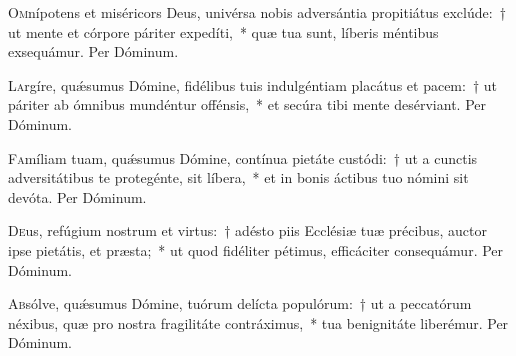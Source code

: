 \documentclass[vesperale_romanum.tex]{subfiles}
\begin{document}


\oratio

\lettrine{O}{m}nípotens et miséricors Deus, univérsa nobis adversántia propitiátus exclúde:~† ut mente et córpore páriter expedíti,~* quæ tua sunt, líberis méntibus exsequámur. Per Dóminum.



\oratio

\lettrine{L}{a}rgíre, quǽsumus Dómine, fidélibus tuis indulgéntiam placátus et pacem:~† ut páriter ab ómnibus mundéntur offénsis,~* et secúra tibi mente desérviant. Per Dóminum.



\oratio

\lettrine{F}{a}míliam tuam, quǽsumus Dómine, contínua pietáte custódi:~† ut a cunctis adversitátibus te protegénte, sit líbera,~* et in bonis áctibus tuo nómini sit devóta. Per Dóminum.



\oratio

\lettrine{D}{e}us, refúgium nostrum et virtus:~† adésto piis Ecclésiæ tuæ précibus, auctor ipse pietátis, et præsta;~* ut quod fidéliter pétimus, efficáciter consequámur. Per Dóminum.




\oratio

\lettrine{A}{b}sólve, quǽsumus Dómine, tuórum delícta populórum:~† ut a peccatórum néxibus, quæ pro nostra fragilitáte contráximus,~* tua benignitáte liberémur. Per Dóminum.
\end{document}

